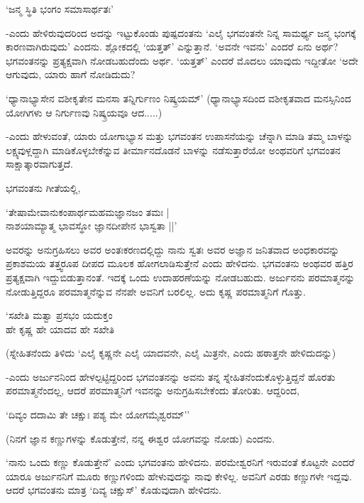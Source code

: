 \begin{shloka}
`ಜನ್ಮ ಸ್ಥಿತಿ ಭಂಗಂ ಸಮಾಸಾರ್ಥತಃ'
\end{shloka}

-ಎಂದು ಹೇಳಿರುವುದರಿಂದ ಅದನ್ನು ಇಟ್ಟುಕೊಂಡು ಪುಷ್ಪದಂತನು `ಎಲೈ ಭಗವಂತನೇ ನಿನ್ನ ಸಾಮರ್ಥ್ಯ ಜನ್ಮ ಭಂಗಕ್ಕೆ ಕಾರಣವಾಗಿರುವುದು' ಎಂದನು. ಶ್ಲೋಕದಲ್ಲಿ `ಯತ್ತತ್' ಎನ್ನುತ್ತಾನೆ. `ಅವನೇ ಇವನು' ಎಂದರೆ ಏನು ಅರ್ಥ? ಭಗವಂತನನ್ನು ಪ್ರತ್ಯಕ್ಷವಾಗಿ ನೋಡಬಹುದೆಂದು ಅರ್ಥ. `ಯತ್ತತ್' ಎಂದರೆ ಮೊದಲು ಯಾವುದು ಇದ್ದೀತೋ `ಅದೇ ಆಗುವುದು, ಯಾರು ಹಾಗೆ ನೋಡಿದುದು?

`ಧ್ಯಾನಾಭ್ಯಾಸೇನ ವಶೀಕೃತೇನ ಮನಸಾ ತನ್ನಿರ್ಗುಣಂ ನಿಷ್ಕ್ರಯಮ್' (ಧ್ಯಾನಾಭ್ಯಾಸದಿಂದ ವಶೀಕೃತವಾದ ಮನಸ್ಸಿನಿಂದ ಯೋಗಿಗಳು ಆ ನಿರ್ಗುಣವು ನಿಷ್ಕ್ರಯವೂ ಆದ.....)

-ಎಂದು ಹೇಳುವಂತೆ, ಯಾರು ಯೋಗಾಭ್ಯಾಸ ಮತ್ತು ಭಗವಂತನ ಉಪಾಸನೆಯನ್ನು ಚೆನ್ನಾಗಿ ಮಾಡಿ ತಮ್ಮ ಬಾಳನ್ನು ಲಕ್ಷ್ಯವುಳ್ಲದ್ದಾಗಿ ಮಾಡಿಕೊಳ್ಳಬೇಕೆನ್ನುವ ತೀರ್ಮಾನದೊಡನೆ ಬಾಳನ್ನು ನಡೆಸುತ್ತಾರೆಯೋ ಅಂಥವರಿಗೆ ಭಗವಂತನ ಸಾಕ್ಷಾತ್ಕಾರವಾಗುತ್ತದೆ.

ಭಗವಂತನು ಗೀತೆಯಲ್ಲಿ,

\begin{shloka}
`ತೇಷಾಮೇವಾನುಕಂಪಾರ್ಥಮಹಮಜ್ಞಾನಜಂ ತಮಃ |\\
ನಾಶಯಾಮ್ಯಾತ್ಮ ಭಾವಸ್ಥೋ ಜ್ಞಾನದೀಪೇನ ಭಾಸ್ವತಾ ||'
\end{shloka}

ಅವರನ್ನು ಅನುಗ್ರಹಿಸಲು ಅವರ ಅಂತಃಕರಣದಲ್ಲಿದ್ದು ನಾನು ಸ್ವತಃ ಅವರ ಅಜ್ಞಾನ ಜನಿತವಾದ ಅಂಧಕಾರವನ್ನು ಪ್ರಕಾಶಮಯ ತತ್ತ್ವರೂಪ ದೀಪದ ಮೂಲಕ ಹೋಗಲಾಡಿಸುತ್ತೇನೆ ಎಂದು ಹೇಳಿದನು. ಭಗವಂತನು ಅಂಥವರ ಹತ್ತಿರ ಪ್ರತ್ಯಕ್ಷವಾಗಿ ಇದ್ದುಬಿಡುತ್ತಾನಂತೆ. ಇದಕ್ಕೆ ಒಂದು ಉದಾಹರಣೆಯನ್ನು ನೋಡಬಹುದು. ಅರ್ಜುನನು ಪರಮಾತ್ಮನನ್ನು ನೋಡುತ್ತಿದ್ದರೂ ಪರಮಾತ್ಮನೆನ್ನುವ ನೆನಪೇ ಅವನಿಗೆ ಬರಲಿಲ್ಲ. ಅದು ಕೃಷ್ಣ ಪರಮಾತ್ಮನಿಗೆ ಗೊತ್ತು.

\begin{shloka}
`ಸಖೇತಿ ಮತ್ವಾ ಪ್ರಸಭಂ ಯದುಕ್ತಂ\\
ಹೇ ಕೃಷ್ಣ ಹೇ ಯಾದವ ಹೇ ಸಖೇತಿ
\end{shloka}

(ಸ್ನೇಹಿತನೆಂದು ತಿಳಿದು `ಎಲೈ ಕೃಷ್ಣನೇ ಎಲೈ ಯಾದವನೇ, ಎಲೈ ಮಿತ್ರನೇ, ಎಂದು ಹಠಾತ್ತನೇ ಹೇಳಿದುದನ್ನು)

-ಎಂದು ಅರ್ಜುನನಿಂದ ಹೇಳಲ್ಪಟ್ಟಿದ್ದರಿಂದ ಭಗವಂತನನ್ನು ಅವನು ತನ್ನ ಸ್ನೇಹಿತನೆಂದುಕೊಳ್ಳುತ್ತಿದ್ದನೆ ಹೊರತು ಪರಮಾತ್ಮನೆಂದಲ್ಲ, ಆದರೆ ಪರಮಾತ್ಮನಿಗೆ ಇವನನ್ನು ಅನುಗ್ರಹಿಸಬೇಕೆಂದು ತೋರಿತು. ಆದ್ದರಿಂದ,

\begin{shloka}
`ದಿವ್ಯಂ ದದಾಮಿ ತೇ ಚಕ್ಷುಃ ಪಶ್ಯ ಮೇ ಯೋಗಮೈಶ್ವರಮ್''
\end{shloka}

(ನಿನಗೆ ಜ್ಞಾನ ಕಣ್ಣುಗಳನ್ನು ಕೊಡುತ್ತೇನೆ, ನನ್ನ ಈಶ್ವರ ಯೋಗವನ್ನು ನೋಡು) ಎಂದನು.

`ನಾನು ಒಂದು ಕಣ್ಣು ಕೊಡುತ್ತೇನೆ' ಎಂದು ಭಗವಂತನು ಹೇಳಿದನು. ಪರಮೇಶ್ವರನಿಗೆ ಇರುವಂತೆ ಕೊಟ್ಟನೇ ಎಂದರೆ ಯಾರೂ ಅರ್ಜುನನಿಗೆ ಮೂರು ಕಣ್ಣುಗಳಿಂದು ಹೇಳುವುದನ್ನು ನಾವು ಕೇಳಿಲ್ಲ. ಅವನಿಗೆ ಎರಡು ಕಣ್ಣುಗಳೇ ಇದ್ದವು. ಆದರೆ ಭಗವಂತನು ಮಾತ್ರ `ದಿವ್ಯ ಚಕ್ಷುಸ್' ಕೊಡುವುದಾಗಿ ಹೇಳಿದನು.

